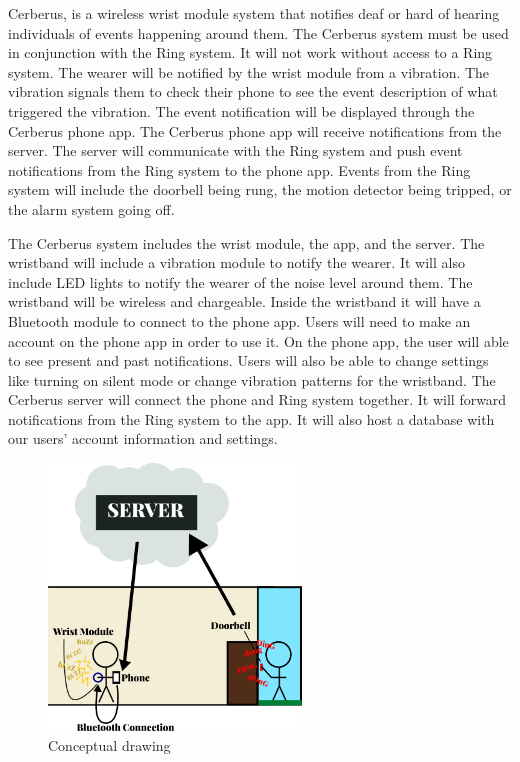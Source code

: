 \quad \quad Cerberus, is a wireless wrist module system that notifies deaf or hard of hearing individuals of events happening around them. The Cerberus system must be used in conjunction with the Ring system. It will not work without access to a Ring system. The wearer will be notified by the wrist module from a vibration. The vibration signals them to check their phone to see the event description of what triggered the vibration. The event notification will be displayed through the Cerberus phone app. The Cerberus phone app will receive notifications from the server. The server will communicate with the Ring system and push event notifications from the Ring system to the phone app. Events from the Ring system will include the doorbell being rung, the motion detector being tripped, or the alarm system going off.

\quad The Cerberus system includes the wrist module, the app, and the server. The wristband will include a vibration module to notify the wearer. It will also include LED lights to notify the wearer of the noise level around them. The wristband will be wireless and chargeable. Inside the wristband it will have a Bluetooth module to connect to the phone app. Users will need to make an account on the phone app in order to use it. On the phone app, the user will able to see present and past notifications. Users will also be able to change settings like turning on silent mode or change vibration patterns for the wristband. The Cerberus server will connect the phone and Ring system together. It will forward notifications from the Ring system to the app. It will also host a database with our users' account information and settings. 

\begin{figure}[h!]
	\centering
   	\includegraphics[width=0.60\textwidth]{images/high-level-system-overview.png}
    \caption{Conceptual drawing}
\end{figure}